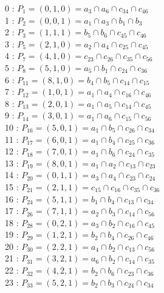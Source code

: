 \documentclass{article}
\begin{document}
{0 : $P_{1}=( 0, 1, 0 ) = a_{3} \cap a_{6} \cap c_{34} \cap c_{46}$\\
1 : $P_{2}=( 0, 0, 1 ) = a_{1} \cap a_{3} \cap b_{1} \cap b_{3}$\\
2 : $P_{3}=( 1, 1, 1 ) = b_{5} \cap b_{6} \cap c_{45} \cap c_{46}$\\
3 : $P_{5}=( 2, 1, 0 ) = a_{2} \cap a_{4} \cap c_{25} \cap c_{45}$\\
4 : $P_{7}=( 4, 1, 0 ) = c_{23} \cap c_{26} \cap c_{35} \cap c_{56}$\\
5 : $P_{8}=( 5, 1, 0 ) = a_{5} \cap b_{1} \cap c_{24} \cap c_{36}$\\
6 : $P_{11}=( 8, 1, 0 ) = b_{4} \cap b_{5} \cap c_{14} \cap c_{15}$\\
7 : $P_{12}=( 1, 0, 1 ) = a_{1} \cap a_{4} \cap c_{16} \cap c_{46}$\\
8 : $P_{13}=( 2, 0, 1 ) = a_{1} \cap a_{5} \cap c_{14} \cap c_{45}$\\
9 : $P_{14}=( 3, 0, 1 ) = a_{1} \cap a_{6} \cap c_{15} \cap c_{56}$\\
10 : $P_{16}=( 5, 0, 1 ) = a_{1} \cap b_{5} \cap c_{26} \cap c_{34}$\\
11 : $P_{17}=( 6, 0, 1 ) = a_{1} \cap b_{4} \cap c_{25} \cap c_{36}$\\
12 : $P_{18}=( 7, 0, 1 ) = a_{1} \cap b_{6} \cap c_{24} \cap c_{35}$\\
13 : $P_{19}=( 8, 0, 1 ) = a_{1} \cap a_{2} \cap c_{13} \cap c_{23}$\\
14 : $P_{20}=( 0, 1, 1 ) = a_{3} \cap a_{4} \cap c_{23} \cap c_{24}$\\
15 : $P_{21}=( 2, 1, 1 ) = c_{15} \cap c_{16} \cap c_{35} \cap c_{36}$\\
16 : $P_{24}=( 5, 1, 1 ) = b_{1} \cap b_{4} \cap c_{13} \cap c_{34}$\\
17 : $P_{26}=( 7, 1, 1 ) = a_{2} \cap b_{3} \cap c_{14} \cap c_{56}$\\
18 : $P_{28}=( 0, 2, 1 ) = a_{3} \cap b_{2} \cap c_{16} \cap c_{45}$\\
19 : $P_{29}=( 1, 2, 1 ) = b_{2} \cap b_{4} \cap c_{26} \cap c_{46}$\\
20 : $P_{30}=( 2, 2, 1 ) = a_{4} \cap b_{2} \cap c_{13} \cap c_{56}$\\
21 : $P_{31}=( 3, 2, 1 ) = a_{6} \cap b_{2} \cap c_{14} \cap c_{35}$\\
22 : $P_{32}=( 4, 2, 1 ) = b_{2} \cap b_{6} \cap c_{23} \cap c_{36}$\\
23 : $P_{33}=( 5, 2, 1 ) = b_{2} \cap b_{3} \cap c_{24} \cap c_{34}$\\
}
\end{document}
